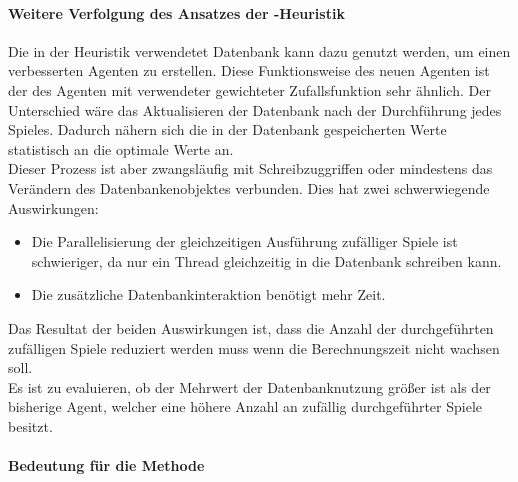 \paragraph{Weitere Verfolgung des Ansatzes der -Heuristik}
Die in der  Heuristik verwendetet Datenbank kann dazu genutzt werden, um einen verbesserten Agenten zu erstellen. Diese Funktionsweise des neuen Agenten ist der des  Agenten mit verwendeter gewichteter Zufallsfunktion sehr ähnlich. Der Unterschied wäre das Aktualisieren der Datenbank nach der Durchführung jedes Spieles. Dadurch nähern sich die in der Datenbank gespeicherten Werte statistisch an die optimale Werte an.
\\Dieser Prozess ist aber zwangsläufig mit Schreibzuggriffen oder mindestens das Verändern des Datenbankenobjektes verbunden. Dies hat zwei schwerwiegende Auswirkungen:
\begin{itemize}
\item Die Parallelisierung der gleichzeitigen Ausführung zufälliger Spiele ist schwieriger, da nur ein Thread gleichzeitig in die Datenbank schreiben kann.
\item Die zusätzliche Datenbankinteraktion benötigt mehr Zeit.
\end{itemize}
Das Resultat der beiden Auswirkungen ist, dass die Anzahl der durchgeführten zufälligen Spiele reduziert werden muss wenn die Berechnungszeit nicht wachsen soll.
\\Es ist zu evaluieren, ob der Mehrwert der Datenbanknutzung größer ist als der bisherige  Agent, welcher eine höhere Anzahl an zufällig durchgeführter Spiele besitzt.
\paragraph{Bedeutung für die Methode}

